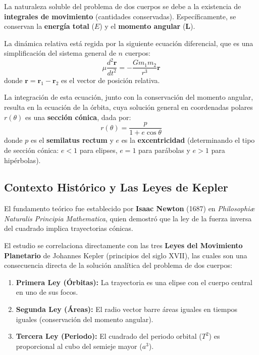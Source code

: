 La naturaleza soluble del problema de dos cuerpos se debe a la existencia de \textbf{integrales de movimiento} (cantidades conservadas). Específicamente, se conservan la \textbf{energía total} ($E$) y el \textbf{momento angular} ($\mathbf{L}$).

La dinámica relativa está regida por la siguiente ecuación diferencial, que es una simplificación del sistema general de $n$ cuerpos:
\begin{equation}
    \mu \frac{d^2 \mathbf{r}}{dt^2} = - \frac{G m_1 m_2}{r^3} \mathbf{r}
\end{equation}
donde $\mathbf{r} = \mathbf{r}_1 - \mathbf{r}_2$ es el vector de posición relativa.

La integración de esta ecuación, junto con la conservación del momento angular, resulta en la ecuación de la órbita, cuya solución general en coordenadas polares $r(\theta)$ es una \textbf{sección cónica}, dada por:
\begin{equation}
    r(\theta) = \frac{p}{1 + e \cos \theta}
\end{equation}
donde $p$ es el \textbf{semilatus rectum} y $e$ es la \textbf{excentricidad} (determinando el tipo de sección cónica: $e<1$ para elipses, $e=1$ para parábolas y $e>1$ para hipérbolas).

\subsection{Contexto Histórico y Las Leyes de Kepler}
\label{subsec:contexto_historico_dos_cuerpos}

El fundamento teórico fue establecido por \textbf{Isaac Newton} (1687) en \textit{Philosophiæ Naturalis Principia Mathematica}, quien demostró que la ley de la fuerza inversa del cuadrado implica trayectorias cónicas.

El estudio se correlaciona directamente con las tres \textbf{Leyes del Movimiento Planetario} de Johannes Kepler (principios del siglo XVII), las cuales son una consecuencia directa de la solución analítica del problema de dos cuerpos:
\begin{enumerate}
    \item \textbf{Primera Ley (Órbitas):} La trayectoria es una elipse con el cuerpo central en uno de sus focos.
    \item \textbf{Segunda Ley (Áreas):} El radio vector barre áreas iguales en tiempos iguales (conservación del momento angular).
    \item \textbf{Tercera Ley (Periodo):} El cuadrado del periodo orbital ($T^2$) es proporcional al cubo del semieje mayor ($a^3$).
\end{enumerate}

